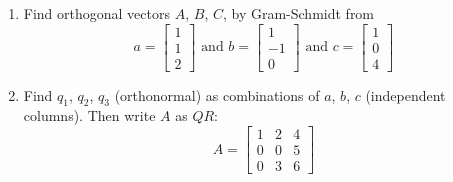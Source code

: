 \begin{enumerate}[label=(\alph*)]
    \item Find orthogonal vectors $A$, $B$, $C$, by Gram-Schmidt from
        \begin{equation}
            a =
            \begin{bmatrix}
                1       \\
                1       \\
                2
            \end{bmatrix}
            \text{ and } 
            b =
            \begin{bmatrix}
                1       \\
                -1      \\
                0
            \end{bmatrix}
            \text{ and } 
            c =
            \begin{bmatrix}
                1       \\
                0      \\
                4
            \end{bmatrix}
        \end{equation}
    \item Find $q_{1}$, $q_{2}$, $q_{3}$ (orthonormal) as combinations of
        $a$, $b$, $c$ (independent columns). Then write $A$ as $QR$:
        \begin{equation}
            A   = 
            \begin{bmatrix}
                1   &   2   &   4   \\
                0   &   0   &   5   \\
                0   &   3   &   6
            \end{bmatrix}
        \end{equation}
\end{enumerate}

